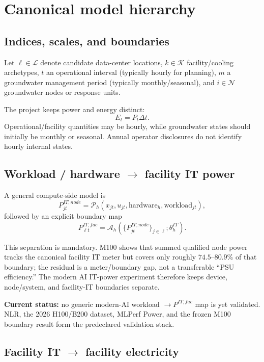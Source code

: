 \documentclass[11pt]{article}
\begin{document}
\section{Canonical model hierarchy}

\subsection{Indices, scales, and boundaries}

Let $\ell\in\mathcal L$ denote candidate data-center locations, $k\in\mathcal K$ facility/cooling archetypes, $t$ an operational interval (typically hourly for planning), $m$ a groundwater management period (typically monthly/seasonal), and $i\in\mathcal N$ groundwater nodes or response units.

The project keeps power and energy distinct:
\[
E_t=P_t\Delta t.
\]
Operational/facility quantities may be hourly, while groundwater states should initially be monthly or seasonal. Annual operator disclosures do not identify hourly internal states.

\subsection{Workload / hardware $\rightarrow$ facility IT power}

A general compute-side model is
\[
P^{IT,node}_{jt}
=\mathcal P_h(x_{jt},u_{jt},\text{hardware}_h,\text{workload}_{jt}),
\]
followed by an explicit boundary map
\[
P^{IT,fac}_{\ell t}
=\mathcal A_h\!\left(\{P^{IT,node}_{jt}\}_{j\in\ell};\theta_h^{IT}\right).
\]

This separation is mandatory. M100 shows that summed qualified node power tracks the canonical facility IT meter but covers only roughly $74.5$--$80.9\%$ of that boundary; the residual is a meter/boundary gap, not a transferable ``PSU efficiency.'' The modern AI IT-power experiment therefore keeps device, node/system, and facility-IT boundaries separate.

\textbf{Current status:} no generic modern-AI workload $\rightarrow P^{IT,fac}$ map is yet validated. NLR, the 2026 H100/B200 dataset, MLPerf Power, and the frozen M100 boundary result form the predeclared validation stack.

\subsection{Facility IT $\rightarrow$ facility electricity}
\end{document}
